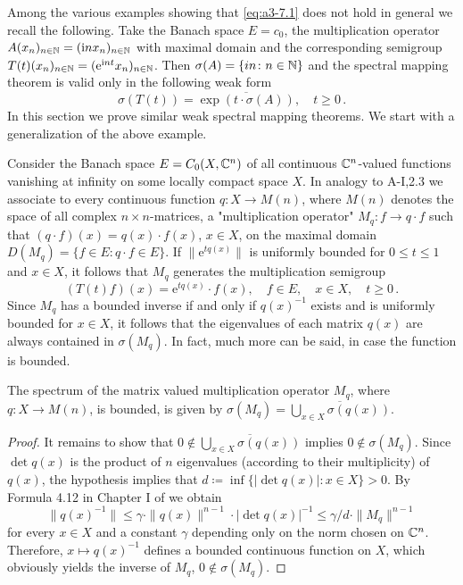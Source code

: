 Among the various examples showing that \eqref{eq:a3-7.1} does not hold in general we recall the following.
Take the Banach space $E = c_{0}$, the multiplication operator $A(x_{n})_{n\in\mathbb{N}} = (\mathrm{i} n x_{n})_{n\in\mathbb{N}}$ with maximal domain and the corresponding semigroup $T(t)(x_{n})_{n \in \mathbb{N}} = 
(\mathrm{e}^{\mathrm{i} nt}x_{n})_{n \in \mathbb{N}}$.
Then $\sigma(A) = \{in \colon n \in \mathbb{N}\}$ and the spectral mapping theorem is valid only in the following weak form
\begin{equation}\label{eq:a3-7.2}
\sigma(T(t)) = \overline{\exp(t\cdot\sigma(A))}, \quad t \geq 0\,.
\end{equation}
In this section we prove similar weak spectral mapping theorems.
We start with a generalization of the above example.

Consider the Banach space $E = C_{0}(X,\mathbb{C}^{n})$ of all continuous $\mathbb{C}^{n}$-valued functions vanishing at infinity on some locally compact space $X$.
In analogy to A-I,2.3 we associate to every continuous function $q \colon X \to M(n)$, where $M(n)$ denotes the space of all complex $n\times n$-matrices, a "multiplication operator" $M_{q} \colon f \to q\cdot f$ such that $(q\cdot f)(x) = q(x)\cdot f(x)$, $x \in X$, on the maximal domain $D(M_{q}) = \{f \in E \colon q\cdot f \in E\}$.
If $\|\mathrm{e}^{tq(x)}\|$ is uniformly bounded for $0 \leq t \leq 1$ and $x \in X$, it follows that $M_{q}$ generates the multiplication semigroup
\[
(T(t)f)(x) = \mathrm{e}^{tq(x)}\cdot f(x), \quad f \in E, \quad x \in X, \quad t \geq 0\,.
\]
Since $M_{q}$ has a bounded inverse if and only if $q(x)^{-1}$ exists and is uniformly bounded for $x \in X$, it follows that the eigenvalues of each matrix $q(x)$ are always contained in $\sigma(M_{q})$.
In fact, much more can be said, in case the function is bounded.
\begin{lemma}\label{lem:a3-7.1}
The spectrum of the matrix valued multiplication operator $M_{q}$, where $q \colon X \to M(n)$, is bounded, is given by $\sigma(M_{q}) = \overline{\bigcup_{x\in X} \sigma(q(x))}$.
\end{lemma}
\begin{proof}
It remains to show that $0 \notin \overline{\bigcup_{x\in X} \sigma(q(x))}$ implies $0 \notin \sigma(M_{q})$.
Since $\det q(x)$ is the product of $n$ eigenvalues (according to their multiplicity) of $q(x)$, the hypothesis implies that $d \coloneqq \inf\{|\det q(x)| \colon x \in X\} > 0$.
By Formula 4.12 in Chapter I of \citet{kato:1966} we obtain
\[
\|q(x)^{-1}\| \leq \gamma \cdot \|q(x)\|^{n-1} \cdot |\det q(x)|^{-1} \leq \gamma/d \cdot \|M_{q}\|^{n-1}
\]
for every $x \in X$ and a constant $\gamma$ depending only on the norm chosen on $\mathbb{C}^{n}$.
Therefore, $x \mapsto q(x)^{-1}$ defines a bounded continuous function on $X$, which obviously yields the inverse of $M_{q}$, \ie $0 \notin \sigma(M_{q})$.
\end{proof}

